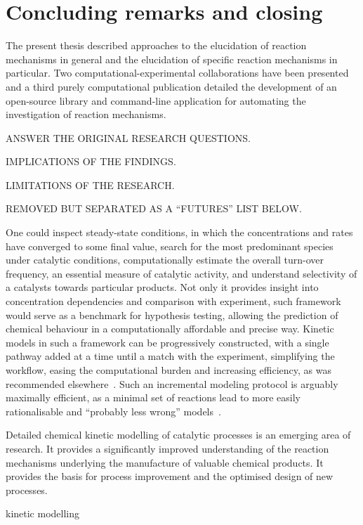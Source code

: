 \chapter{Concluding remarks and closing}%
\label{ch:conclusion}

The present thesis described approaches to the elucidation of reaction
mechanisms in general and the elucidation of specific reaction mechanisms in
particular.
Two computational-experimental collaborations have been presented and a third
purely computational publication detailed the development of an open-source
library and command-line application for automating the investigation of
reaction mechanisms.

ANSWER THE ORIGINAL RESEARCH QUESTIONS.\@

IMPLICATIONS OF THE FINDINGS.\@

LIMITATIONS OF THE RESEARCH.\@

REMOVED BUT SEPARATED AS A ``FUTURES'' LIST BELOW.\@

One could inspect steady-state conditions, in which the concentrations and rates have converged to some final value, search for the most predominant species under catalytic conditions, computationally estimate the overall turn-over frequency, an essential measure of catalytic activity, and understand selectivity of a catalysts towards particular products.
Not only it provides insight into concentration dependencies and comparison with experiment, such framework would serve as a benchmark for hypothesis testing, allowing the prediction of chemical behaviour in a computationally affordable and precise way.
Kinetic models in such a framework can be progressively constructed, with a single pathway added at a time until a match with the experiment, simplifying the workflow, easing the computational burden and increasing efficiency, as was recommended elsewhere~\cite{Jara_z_2019}.
Such an incremental modeling protocol is arguably maximally efficient, as a
minimal set of reactions lead to more easily rationalisable and
``probably less wrong'' models~\cite{Blackmond_2015,Jara_z_2019}.

Detailed chemical kinetic modelling of catalytic processes is an emerging area of research. It provides a significantly improved understanding of the reaction mechanisms underlying the manufacture of valuable chemical products. It provides the basis for process improvement and the optimised design of new processes.

kinetic modelling

